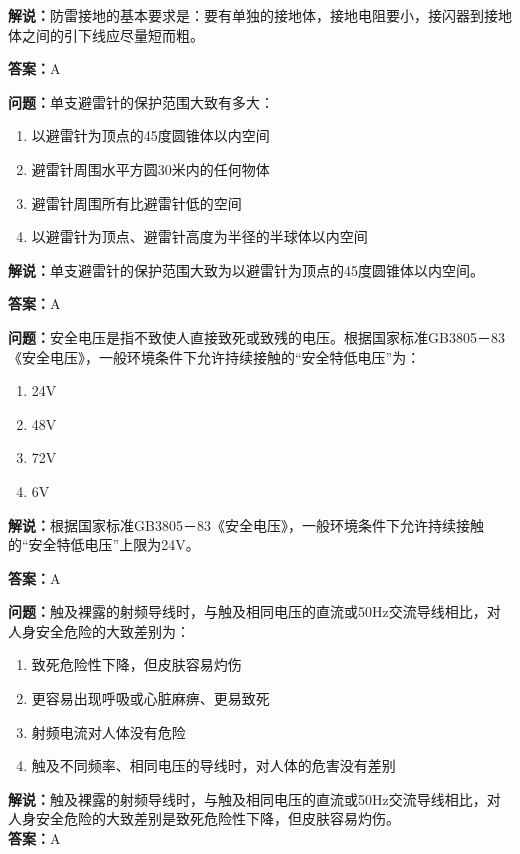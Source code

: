 \documentclass[UTF8]{ctexbook}
\begin{document}
\textbf{解说：}防雷接地的基本要求是：要有单独的接地体，接地电阻要小，接闪器到接地体之间的引下线应尽量短而粗。%

\textbf{答案：}A

\textbf{问题：}单支避雷针的保护范围大致有多大：

\begin{enumerate}[label=\Alph*), leftmargin=3em]
  \item 以避雷针为顶点的45度圆锥体以内空间
  \item 避雷针周围水平方圆30米内的任何物体
  \item 避雷针周围所有比避雷针低的空间
  \item 以避雷针为顶点、避雷针高度为半径的半球体以内空间
\end{enumerate}

\textbf{解说：}单支避雷针的保护范围大致为以避雷针为顶点的45度圆锥体以内空间。%

\textbf{答案：}A

\textbf{问题：}安全电压是指不致使人直接致死或致残的电压。根据国家标准GB3805－83《安全电压》，一般环境条件下允许持续接触的“安全特低电压”为：

\begin{enumerate}[label=\Alph*), leftmargin=3em]
  \item 24V
  \item 48V
  \item 72V
  \item 6V
\end{enumerate}

\textbf{解说：}根据国家标准GB3805－83《安全电压》，一般环境条件下允许持续接触的“安全特低电压”上限为24V。%

\textbf{答案：}A

\textbf{问题：}触及裸露的射频导线时，与触及相同电压的直流或50Hz交流导线相比，对人身安全危险的大致差别为：
\begin{enumerate}[label=\Alph*), leftmargin=3em]
  \item 致死危险性下降，但皮肤容易灼伤
  \item 更容易出现呼吸或心脏麻痹、更易致死
  \item 射频电流对人体没有危险
  \item 触及不同频率、相同电压的导线时，对人体的危害没有差别
\end{enumerate}
\textbf{解说：}触及裸露的射频导线时，与触及相同电压的直流或50Hz交流导线相比，对人身安全危险的大致差别是致死危险性下降，但皮肤容易灼伤。\\
\textbf{答案：}A
\end{document}
